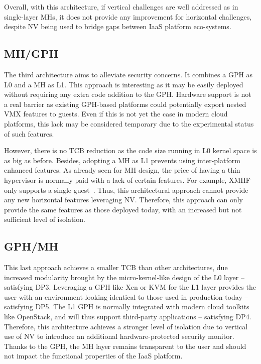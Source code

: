 \documentclass{sig-alternate}
\begin{document}
Overall, with this architecture, if vertical challenges are well addressed as in single-layer MHs, it does not provide any improvement for horizontal challenges, despite NV being used to bridge gaps between IaaS platform eco-systems.

\subsection{MH/GPH}
\label{par:mog}

\noindent The third architecture aims to alleviate security concerns. It combines a GPH as L0 and a MH as L1. 
This approach is interesting as it may be easily deployed without requiring any extra code addition to the GPH. Hardware support is not a real barrier as existing GPH-based platforms could potentially export nested VMX features to guests. Even if this is not yet the case in modern cloud platforms, this lack may be considered temporary due to the experimental status of such features.

However, there is no TCB reduction as the code size running in L0 kernel space is as big as before. 
Besides, adopting a MH as L1 prevents using inter-platform enhanced features. As already seen for MH design, the price of having a thin hypervisor is normally paid with a lack of certain features. For example, XMHF only supports a single guest~\cite{xmhf}. Thus, this architectural approach cannot provide any new horizontal features leveraging NV. Therefore, this approach can only provide the same features as those deployed today, with an increased but not sufficient level of isolation.

\subsection{GPH/MH}
\label{par:gom}

\noindent This last approach achieves a smaller TCB than other architectures, due increased modularity brought by the micro-kernel-like design of the L0 layer -- satisfying DP3. Leveraging a GPH like Xen or KVM for the L1 layer provides the user with an environment looking identical to those used in production today -- satisfying DP5. The L1 GPH is normally integrated with modern cloud toolkits like OpenStack, and will thus support third-party applications -- satisfying DP4.
Therefore, this architecture achieves a stronger level of isolation due to vertical use of NV to introduce an additional hardware-protected security monitor. Thanks to the GPH, the MH layer remains transparent to the user and should not impact the functional properties of the IaaS platform.
\end{document}
